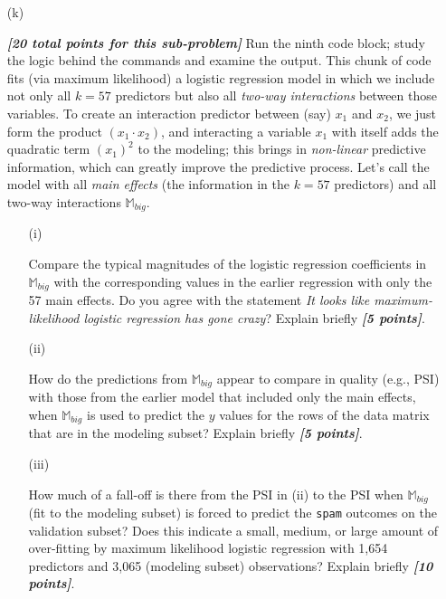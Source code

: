 \documentclass[12pt]{article}
\newcommand{\bi}[1]{\textbf{\textit{#1}}}
\begin{document}
\begin{itemize}

\item[(k)]

\bi{[20 total points for this sub-problem]} Run the ninth code block; study the logic behind the commands and examine the output. This chunk of code fits (via maximum likelihood) a logistic regression model in which we include not only all $k = 57$ predictors but also all \textit{two-way interactions} between those variables. To create an interaction predictor between (say) $x_1$ and $x_2$, we just form the product $( x_1 \cdot x_2 )$, and interacting a variable $x_1$ with itself adds the quadratic term $( x_1 )^2$ to the modeling; this brings in \textit{non-linear} predictive information, which can greatly improve the predictive process. Let's call the model with all \textit{main effects} (the information in the $k = 57$ predictors) and all two-way interactions $\mathbb{ M }_{ big }$.

\begin{itemize}

\item[(i)]

Compare the typical magnitudes of the logistic regression coefficients in $\mathbb{ M }_{ big }$ with the corresponding values in the earlier regression with only the 57 main effects. Do you agree with the statement \textit{It looks like maximum-likelihood logistic regression has gone crazy}? Explain briefly \bi{[5 points]}.

\item[(ii)]

How do the predictions from $\mathbb{ M }_{ big }$ appear to compare in quality (e.g., PSI) with those from the earlier model that included only the main effects, when $\mathbb{ M }_{ big }$ is used to predict the $y$ values for the rows of the data matrix that are in the modeling subset? Explain briefly \bi{[5 points]}. 

\item[(iii)]

How much of a fall-off is there from the PSI in (ii) to the PSI when $\mathbb{ M }_{ big }$ (fit to the modeling subset) is forced to predict the \texttt{spam} outcomes on the validation subset? Does this indicate a small, medium, or large amount of over-fitting by maximum likelihood logistic regression with 1,654 predictors and 3,065 (modeling subset) observations? Explain briefly \bi{[10 points]}.

\end{itemize}


\end{itemize}
\end{document}
